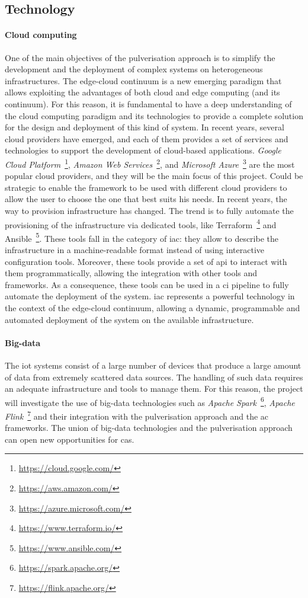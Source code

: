 \documentclass[12pt]{article}
\begin{document}
\subsection{Technology}\label{subsec:technology}

\paragraph{Cloud computing}
One of the main objectives of the pulverisation approach is to simplify the development
and the deployment of complex systems on heterogeneous infrastructures.
%
The edge-cloud continuum is a new emerging paradigm that allows exploiting the
advantages of both cloud and edge computing (and its continuum).
%
For this reason, it is fundamental to have a deep understanding of the cloud computing
paradigm and its technologies to provide a complete solution for the design and deployment
of this kind of system.
%
In recent years, several cloud providers have emerged, and each of them provides
a set of services and technologies to support the development of cloud-based applications.
%
\emph{Google Cloud Platform}~\footnote{\url{https://cloud.google.com/}},
\emph{Amazon Web Services}~\footnote{\url{https://aws.amazon.com/}},
and \emph{Microsoft Azure}~\footnote{\url{https://azure.microsoft.com/}}
are the most popular cloud providers, and they will be the main focus of this project.
%
Could be strategic to enable the framework to be used with different cloud providers
to allow the user to choose the one that best suits his needs.
%
In recent years,
the way to provision infrastructure has changed.
%
The trend is to fully automate the provisioning of the infrastructure via dedicated tools,
like Terraform~\footnote{\url{https://www.terraform.io/}} and Ansible~\footnote{\url{https://www.ansible.com/}}.
%
These tools fall in the category of \ac{iac}: they allow to describe the infrastructure in a machine-readable format
instead of using interactive configuration tools.
%
Moreover,
these tools provide a set of \ac{api} to interact with them programmatically,
allowing the integration with other tools and frameworks.
%
As a consequence,
these tools can be used in a \ac{ci} pipeline to fully automate the deployment of the system.
%
\ac{iac} represents a powerful technology in the context of the edge-cloud continuum,
allowing a dynamic, programmable and automated deployment of the system on the available infrastructure.

\paragraph{Big-data}
The \ac{iot} systems consist of a large number of devices that produce a large amount of data
from extremely scattered data sources.
%
The handling of such data requires an adequate infrastructure and tools to manage them.
%
For this reason, the project will investigate the use of big-data technologies
such as \emph{Apache Spark}~\footnote{\url{https://spark.apache.org/}},
\emph{Apache Flink}~\footnote{\url{https://flink.apache.org/}} and their integration with the pulverisation approach and the \ac{ac} frameworks.
%
The union of big-data technologies and the pulverisation approach can open new opportunities for \ac{cas}.
\end{document}
